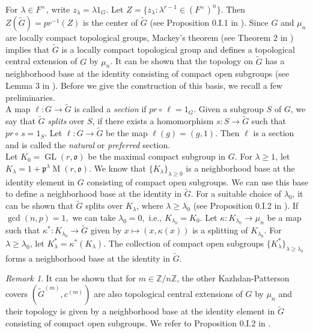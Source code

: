 \documentclass[11pt, a4paper, reqno]{amsart}
\theoremstyle{definition}
\theoremstyle{remark}
\newtheorem{remark}[theorem]{Remark}
\theoremstyle{example}
\theoremstyle{note}
\numberwithin{equation}{section}
\DeclareMathOperator{\GL}{GL}
\DeclareMathOperator{\M}{M}
\begin{document}
For $\lambda \in F^{\times}$, write $z_{\lambda} = \lambda 1_{G}.$ Let $Z = \{z_{\lambda}: \lambda^{r-1} \in (F^{\times})^{n} \}.$ Then $Z(\widetilde{G})=pr^{-1}(Z)$ is the center of $\widetilde{G}$ (see Proposition 0.I.1 in \cite{KazPat[2]}). Since $G$ and $\mu_{n}$ are locally compact topological groups, Mackey's theorem (see Theorem 2 in \cite{Mac}) implies that $\widetilde{G}$ is a locally compact topological group and defines a topological central extension of $G$ by $\mu_{n}$. 
It can be shown that the topology on $\widetilde{G}$ has a neighborhood base at the identity consisting of compact open subgroups (see Lemma 3 in \cite{Kab}). Before we give the construction of this basis, we recall a few preliminaries. \\ 

A map $\ell: G\rightarrow \widetilde{G}$ is called a \textit{section} if $pr\circ\, \ell = 1_{G}$. Given a subgroup $S$ of $G$, we say that $\widetilde{G}$ \textit{splits} over $S$, if there exists a homomorphism $s: S\rightarrow \widetilde{G}$ such that $pr\circ\, s =1_{S}$. Let $\ell: G\rightarrow \widetilde{G}$ be the map $\ell(g)=(g,1)$. Then $\ell$ is a section and is called the \textit{natural} or \textit{preferred} section. \\

Let $K_{0}=\GL(r, \mathfrak{o})$ be the maximal compact subgroup in $G.$ For $\lambda\geq 1$, let $K_{\lambda}= 1+\mathfrak{p}^{\lambda}\M(r,\mathfrak{o})$. We know that $\{K_{\lambda}\}_{\lambda\geq 0}$ is a neighborhood base at the identity element in $G$ consisting of compact open subgroups. We can use this base to define a neighborhood base at the identity in $\widetilde{G}$. For a suitable choice of $\lambda_{0}$, it can be shown that $\widetilde{G}$ splits over $K_{\lambda}$, where $\lambda\geq \lambda_{0}$ (see Proposition 0.I.2 in \cite{KazPat[2]}). If $\gcd(n, p)=1,$ we can take $\lambda_0 = 0,$ i.e., $K_{\lambda_{0}} = K_0.$ Let $\kappa: K_{\lambda_{0}}\rightarrow \mu_n$ be a map such that $\kappa^*: K_{\lambda_{0}}\rightarrow \widetilde{G}$ given by $x \mapsto (x,\kappa(x))$ is a splitting of $K_{\lambda_{0}}.$ For $\lambda \geq \lambda_{0}$, let $K^{*}_{\lambda}= \kappa^*(K_\lambda)$.  The collection of compact open subgroups $\{K^{*}_{\lambda}\}_{\lambda\geq \lambda_0}$ forms a neighborhood base at the identity in $\widetilde{G}$. 


\begin{remark}\label{twisted covers are l-groups} It can be shown that for $m\in \mathbb{Z}/n\mathbb{Z}$, the other Kazhdan-Patterson covers $(\widetilde{G}^{(m)}, c^{(m)})$ are also topological central extensions of $G$ by $\mu_{n}$ and their topology is given by a neighborhood base at the identity element in $\widetilde{G}$ consisting of compact open subgroups. We refer to Proposition 0.I.2 in \cite{KazPat[2]}. 
\end{remark} 
\end{document}
